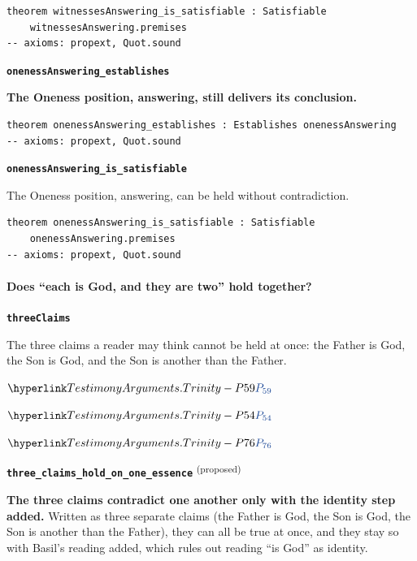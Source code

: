 \documentclass[11pt,paper=\testimonypaper,DIV=13,parskip=false]{scrartcl}
\begin{document}
{\small\begin{verbatim}
theorem witnessesAnswering_is_satisfiable : Satisfiable
    witnessesAnswering.premises
-- axioms: propext, Quot.sound
\end{verbatim}}
\par\medskip\noindent\textbf{\texttt{oneness\allowbreak{}Answering\_\allowbreak{}establishes}}\par\nobreak\noindent
\textbf{The Oneness position, answering, still delivers its conclusion.}

{\small\begin{verbatim}
theorem onenessAnswering_establishes : Establishes onenessAnswering
-- axioms: propext, Quot.sound
\end{verbatim}}
\par\medskip\noindent\textbf{\texttt{oneness\allowbreak{}Answering\_\allowbreak{}is\_\allowbreak{}satisfiable}}\par\nobreak\noindent
The Oneness position, answering, can be held without contradiction.

{\small\begin{verbatim}
theorem onenessAnswering_is_satisfiable : Satisfiable
    onenessAnswering.premises
-- axioms: propext, Quot.sound
\end{verbatim}}
\paragraph*{Does “each is God, and they are two” hold together?}
\leavevmode\par\nobreak
\par\medskip\noindent\textbf{\texttt{three\allowbreak{}Claims}}\par\nobreak\noindent
The three claims a reader may think cannot be held at once: the Father is God, the Son is God, and the Son is another than the Father.

\begin{derivation}
  \item[(1)] \(\pvar{TestimonyArguments.Trinity}{59}\)
  \item[(2)] \(\pvar{TestimonyArguments.Trinity}{54}\)
  \item[(3)] \(\pvar{TestimonyArguments.Trinity}{76}\)
\end{derivation}
\par\medskip\noindent\textbf{\texttt{three\_\allowbreak{}claims\_\allowbreak{}hold\_\allowbreak{}on\_\allowbreak{}one\_\allowbreak{}essence}} \textsuperscript{(proposed)}\par\nobreak\noindent
\textbf{The three claims contradict one another only with the identity step added.} Written as three separate claims (the Father is God, the Son is God, the Son is another than the Father), they can all be true at once, and they stay so with Basil’s reading added, which rules out reading “is God” as identity.
\end{document}
